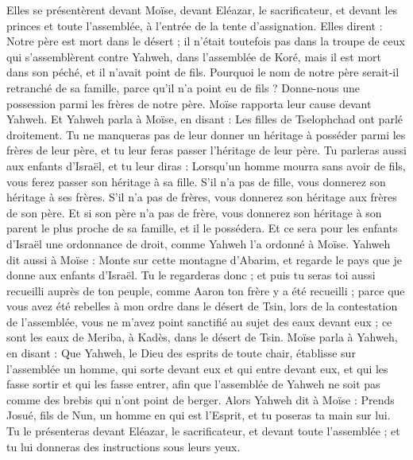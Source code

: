 \begin{multicols}{2}
Elles se présentèrent devant Moïse, devant Eléazar, le sacrificateur, et devant les princes et toute l'assemblée, à l'entrée de la tente d'assignation. Elles dirent :
Notre père est mort dans le désert ; il n'était toutefois pas dans la troupe de ceux qui s’assemblèrent contre Yahweh, dans l'assemblée de Koré, mais il est mort dans son péché, et il n'avait point de fils.
Pourquoi le nom de notre père serait-il retranché de sa famille, parce qu'il n'a point eu de fils ? Donne-nous une possession parmi les frères de notre père.
Moïse rapporta leur cause devant Yahweh.
Et Yahweh parla à Moïse, en disant :
Les filles de Tselophchad ont parlé droitement. Tu ne manqueras pas de leur donner un héritage à posséder parmi les frères de leur père, et tu leur feras passer l’héritage de leur père.
Tu parleras aussi aux enfants d'Israël, et tu leur diras : Lorsqu'un homme mourra sans avoir de fils, vous ferez passer son héritage à sa fille.
S'il n'a pas de fille, vous donnerez son héritage à ses frères.
S'il n'a pas de frères, vous donnerez son héritage aux frères de son père.
Et si son père n'a pas de frère, vous donnerez son héritage à son parent le plus proche de sa famille, et il le possédera. Et ce sera pour les enfants d'Israël une ordonnance de droit, comme Yahweh l'a ordonné à Moïse.
Yahweh dit aussi à Moïse : Monte sur cette montagne d'Abarim, et regarde le pays que je donne aux enfants d'Israël.
Tu le regarderas donc ; et puis tu seras toi aussi recueilli auprès de ton peuple, comme Aaron ton frère y a été recueilli ;
parce que vous avez été rebelles à mon ordre dans le désert de Tsin, lors de la contestation de l'assemblée, vous ne m'avez point sanctifié au sujet des eaux devant eux ; ce sont les eaux de Meriba, à Kadès, dans le désert de Tsin.
Moïse parla à Yahweh, en disant :
Que Yahweh, le Dieu des esprits de toute chair, établisse sur l'assemblée un homme,
qui sorte devant eux et qui entre devant eux, et qui les fasse sortir et qui les fasse entrer, afin que l'assemblée de Yahweh ne soit pas comme des brebis qui n'ont point de berger.
Alors Yahweh dit à Moïse : Prends Josué, fils de Nun, un homme en qui est l'Esprit, et tu poseras ta main sur lui.
Tu le présenteras devant Eléazar, le sacrificateur, et devant toute l'assemblée ; et tu lui donneras des instructions sous leurs yeux.

\end{multicols}
